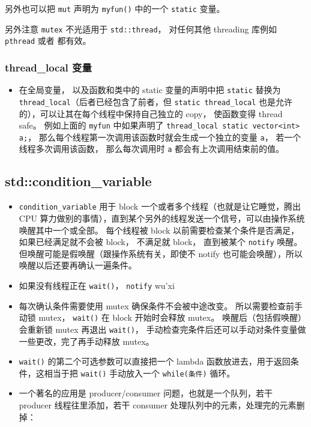 另外也可以把 \verb`mut` 声明为 \verb`myfun()` 中的一个 \verb`static` 变量。

另外注意 \verb`mutex` 不光适用于 \verb`std::thread`， 对任何其他 threading 库例如 \verb`pthread` 或者  都有效。


\subsubsection{thread\_local 变量}
\begin{itemize}
\item 在全局变量， 以及函数和类中的 static 变量的声明中把 \verb`static` 替换为 \verb`thread_local`（后者已经包含了前者，但 \verb`static thread_local` 也是允许的），可以让其在每个线程中保持自己独立的 copy， 使函数变得 thread safe。 例如上面的 \verb`myfun` 中如果声明了 \verb`thread_local static vector<int> a;`， 那么每个线程第一次调用该函数时就会生成一个独立的变量 \verb`a`， 若一个线程多次调用该函数， 那么每次调用时 \verb`a` 都会有上次调用结束前的值。
\end{itemize}

\subsection{std::condition\_variable}
\begin{itemize}
\item \verb`condition_variable` 用于 block 一个或者多个线程（也就是让它睡觉，腾出 CPU 算力做别的事情），直到某个另外的线程发送一个信号，可以由操作系统唤醒其中一个或全部。 每个线程被 block 以前需要检查某个条件是否满足，如果已经满足就不会被 block， 不满足就 block， 直到被某个 \verb`notify` 唤醒。 但唤醒可能是假唤醒（跟操作系统有关，即使不 notify 也可能会唤醒），所以唤醒以后还要再确认一遍条件。
\item 如果没有线程正在 \verb`wait()`， \verb`notify` wu'xi
\item 每次确认条件需要使用 mutex 确保条件不会被中途改变。 所以需要检查前手动锁 mutex， \verb`wait()` 在 block 开始时会释放 mutex。 唤醒后（包括假唤醒）会重新锁 mutex 再退出 \verb`wait()`， 手动检查完条件后还可以手动对条件变量做一些更改，完了再手动释放 mutex。
\item \verb`wait()` 的第二个可选参数可以直接把一个 lambda 函数放进去，用于返回条件，这相当于把 \verb`wait()` 手动放入一个 \verb`while(条件)` 循环。
\item 一个著名的应用是 producer/consumer 问题，也就是一个队列，若干 producer 线程往里添加，若干 consumer 处理队列中的元素，处理完的元素删掉：
\end{itemize}

